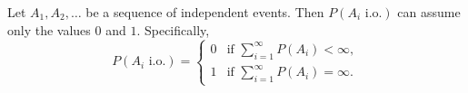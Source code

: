 Let $A_1, A_2, \ldots$ be a sequence of independent events. Then $P(A_i \text{ i.o.})$ can assume only the values $0$ and $1$. Specifically,
$$P(A_i \text{ i.o.}) = \begin{cases}
0 & \text{if } \sum_{i=1}^{\infty} P(A_i) < \infty,\\[6pt]
1 & \text{if } \sum_{i=1}^{\infty} P(A_i) = \infty.
\end{cases}$$
